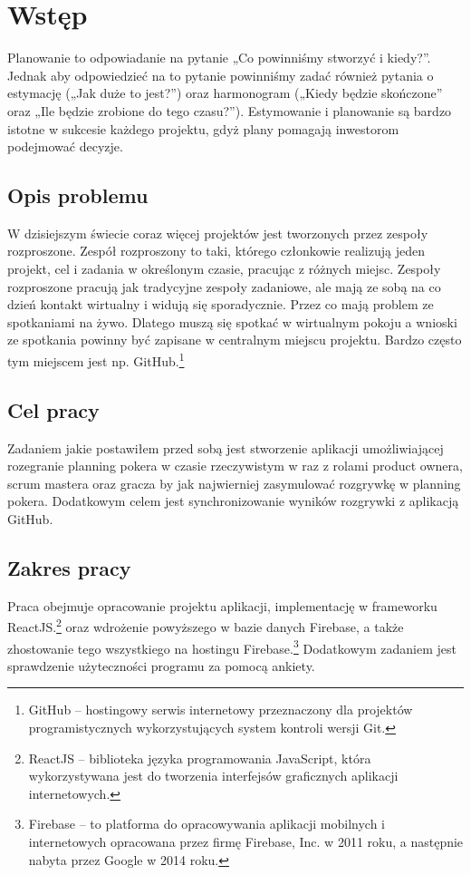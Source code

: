 ﻿\chapter*{Wstęp}
Planowanie to odpowiadanie na pytanie „Co powinniśmy stworzyć i kiedy?”.
Jednak aby odpowiedzieć na to pytanie powinniśmy zadać również pytania o estymację
(„Jak duże to jest?”) oraz harmonogram („Kiedy będzie skończone” oraz „Ile będzie zrobione do tego czasu?”).
Estymowanie i planowanie są bardzo istotne w sukcesie każdego projektu,
gdyż plany pomagają inwestorom podejmować decyzje.\cite{Cohen_2006}
\section*{Opis problemu}

W dzisiejszym świecie coraz więcej projektów jest tworzonych przez zespoły rozproszone.
Zespół rozproszony to taki, którego członkowie realizują jeden projekt,
cel i zadania w określonym czasie, pracując z różnych miejsc. 
Zespoły rozproszone pracują jak tradycyjne zespoły zadaniowe,
ale mają ze sobą na co dzień kontakt wirtualny i widują się sporadycznie.\cite{www_rozproszony}
Przez co mają problem ze spotkaniami na żywo.
Dlatego muszą się spotkać w wirtualnym pokoju a wnioski ze spotkania powinny być zapisane w centralnym miejscu projektu.
Bardzo często tym miejscem jest np. GitHub.\footnote{GitHub – hostingowy serwis internetowy przeznaczony dla projektów programistycznych wykorzystujących system kontroli wersji Git.}

\section*{Cel pracy}

Zadaniem jakie postawiłem przed sobą jest stworzenie aplikacji umożliwiającej rozegranie planning pokera w czasie rzeczywistym w raz z rolami product ownera,
scrum mastera oraz gracza by jak najwierniej zasymulować rozgrywkę w planning pokera.
Dodatkowym celem jest synchronizowanie wyników rozgrywki z aplikacją GitHub.

\section*{Zakres pracy}

Praca obejmuje opracowanie projektu aplikacji, implementację w frameworku ReactJS.\footnote{ReactJS – biblioteka języka programowania JavaScript, która wykorzystywana jest do tworzenia interfejsów graficznych aplikacji internetowych.}
oraz wdrożenie powyższego w bazie danych Firebase, a także zhostowanie tego wszystkiego na hostingu Firebase.\footnote{Firebase – to platforma do opracowywania aplikacji mobilnych i internetowych opracowana przez firmę Firebase, Inc. w 2011 roku, a następnie nabyta przez Google w 2014 roku.}
Dodatkowym zadaniem jest sprawdzenie użyteczności programu za pomocą ankiety.